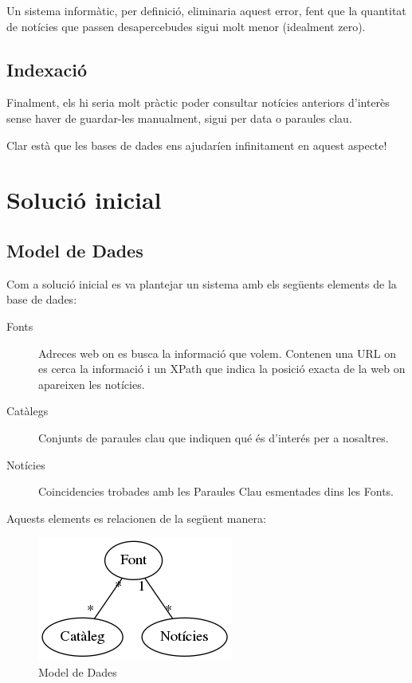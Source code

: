 \documentclass{article}
\begin{document}
Un sistema informàtic, per definició, eliminaria aquest error, fent que la quantitat de notícies que passen desapercebudes sigui molt menor (idealment zero).

\subsection{Indexació}

Finalment, els hi seria molt pràctic poder consultar notícies anteriors d'interès sense haver de guardar-les manualment, sigui per data o paraules clau.

Clar està que les bases de dades ens ajudaríen infinitament en aquest aspecte!

\newpage

\section{Solució inicial}

\subsection{Model de Dades}

Com a solució inicial es va plantejar un sistema amb els següents elements de la base de dades:

\begin{description}
        \item[Fonts] Adreces web on es busca la informació que volem. Contenen una URL on es cerca la informació i un XPath que indica la posició exacta de la web on apareixen les notícies.
        \item[Catàlegs] Conjunts de paraules clau que indiquen qué és d'interés per a nosaltres.
        \item[Notícies] Coincidencies trobades amb les Paraules Clau esmentades dins les Fonts.
\end{description}

Aquests elements es relacionen de la següent manera:

\begin{figure}[!ht]
    \centering
    \includegraphics[scale=1]{db.png}
    \caption{Model de Dades}
\end{figure}
\end{document}
